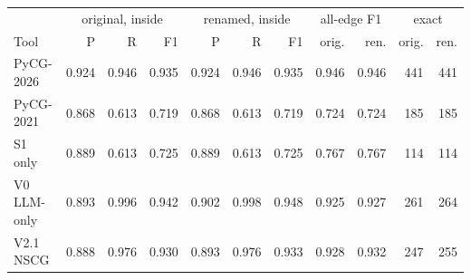 \begin{tabular}{l rrr rrr rr rr}
\toprule
& \multicolumn{3}{c}{original, inside} & \multicolumn{3}{c}{renamed, inside} & \multicolumn{2}{c}{all-edge F1} & \multicolumn{2}{c}{exact}\\
\cmidrule(lr){2-4}\cmidrule(lr){5-7}\cmidrule(lr){8-9}\cmidrule(lr){10-11}
Tool & P & R & F1 & P & R & F1 & orig. & ren. & orig. & ren.\\
\midrule
PyCG-2026 & 0.924 & 0.946 & 0.935 & 0.924 & 0.946 & 0.935 & 0.946 & 0.946 & 441 & 441 \\
PyCG-2021 & 0.868 & 0.613 & 0.719 & 0.868 & 0.613 & 0.719 & 0.724 & 0.724 & 185 & 185 \\
S1 only & 0.889 & 0.613 & 0.725 & 0.889 & 0.613 & 0.725 & 0.767 & 0.767 & 114 & 114 \\
V0 LLM-only & 0.893 & 0.996 & 0.942 & 0.902 & 0.998 & 0.948 & 0.925 & 0.927 & 261 & 264 \\
V2.1 NSCG & 0.888 & 0.976 & 0.930 & 0.893 & 0.976 & 0.933 & 0.928 & 0.932 & 247 & 255 \\
\bottomrule
\end{tabular}
